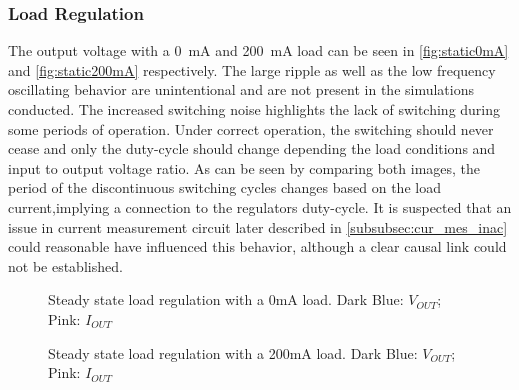 \subsubsection{Load Regulation}
The output voltage with a \qty{0}{\milli\ampere} and \qty{200}{\milli\ampere} load can be seen in \autoref{fig:static0mA} and \autoref{fig:static200mA} respectively. The large ripple as well as the low frequency oscillating behavior are unintentional and are not present in the simulations conducted. The increased switching noise highlights the lack of switching during some periods of operation. Under correct operation, the switching should never cease and only the duty-cycle should change depending the load conditions and input to output voltage ratio. As can be seen by comparing both images, the period of the discontinuous switching cycles changes based on the load current,implying a connection to the regulators duty-cycle. It is suspected that an issue in current measurement circuit later described in \autoref{subsubsec:cur_mes_inac} could reasonable have influenced this behavior, although a clear causal link could not be established.
\label{sec:loadRegulation}
\begin{figure}[ht]
	\centering
	\caption{Steady state load regulation with a 0mA load. Dark Blue: $V_{OUT}$; Pink: $I_{OUT}$}
	\label{fig:static0mA}
\end{figure}
\begin{figure}[ht]
	\centering
	\caption{Steady state load regulation with a 200mA load. Dark Blue: $V_{OUT}$; Pink: $I_{OUT}$}
	\label{fig:static200mA}
\end{figure}
\clearpage



